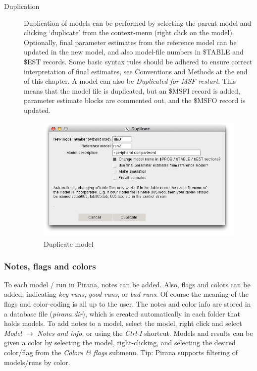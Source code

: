 {\begin{description}
\item[Duplication] Duplication of models can be performed by
selecting the parent model and clicking `duplicate' from the
context-menu (right click on the model). Optionally, final parameter estimates
from the reference model can be updated in the new model, and also
model-file numbers in \$TABLE and \$EST records. Some basic syntax
rules should be adhered to ensure correct interpretation of final
estimates, see Conventions and Methods at the end of this chapter. A
model can also be \textit{Duplicated for MSF restart}. This means that the
model file is duplicated, but an \$MSFI record is added, parameter
estimate blocks are commented out, and the \$MSFO record is updated.

\begin{figure}[H] \centering
    \includegraphics[scale=0.4]{images/duplicate.png}
    \caption{Duplicate model}
\end{figure}

\end{description}

\subsubsection*{Notes, flags and colors}
To each model / run in Pirana, notes can be added. Also, flags and
colors can be added, indicating \textit{key runs}, \textit{good runs},
or \textit{bad runs}. Of course the meaning of the flags and
color-coding is all up to the user. The notes and color info are
stored in a database file (\textit{pirana.dir}), which is created
automatically in each folder that holds models. To add notes to a
model, select the model, right click and select \textit{Model}
$\rightarrow$ \textit{Notes and info}, or using the \textit{Ctrl-I} shortcut. Models and results can be given a color by selecting the model, right-clicking, and selecting the desired color/flag from the \textit{Colors \& flags} submenu. Tip: Pirana supports filtering of models/runs by color.

}
